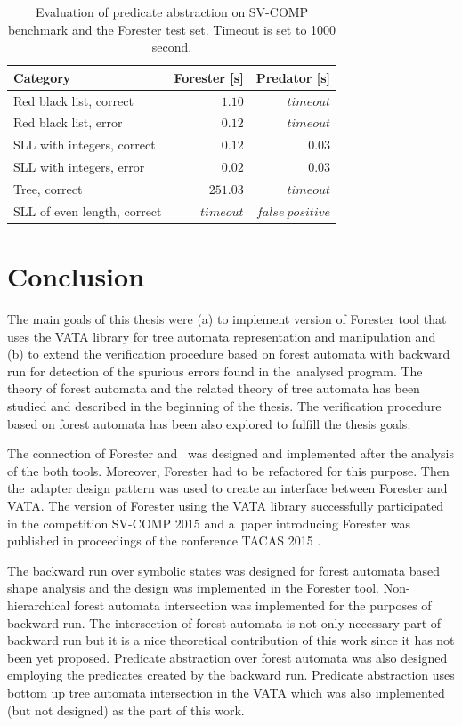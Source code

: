 \begin{table}[bt]
	\vskip6pt
	\caption{Evaluation of predicate abstraction on SV-COMP benchmark
		and the Forester test set.
		Timeout is set to 1000 second.
	}
	\centering
	\begin{tabular}{| l | r | r |}
		\hline
		Category & Forester [s] & Predator [s]  \\
		\hline
		\hline
		Red black list, correct     & $1.10$   &  $timeout$ \\
		\hline
		Red black list, error       & $0.12$   &  $timeout$ \\
		\hline
		SLL with integers, correct  & $0.12$   &  $0.03$ \\
		\hline
		SLL with integers, error    & $0.02$   &  $0.03$ \\
		\hline
		Tree, correct               & $251.03$ &  $timeout$ \\
		\hline
		SLL of even length, correct & $timeout$ & $false\ positive$ \\
		\hline
	\end{tabular}
	\label{tab:patimes}
\end{table}


\chapter{Conclusion}
\label{ch:concl}

The main goals of this thesis were (a) to implement version of Forester tool
that uses the VATA library for tree automata representation and manipulation
and (b) to extend the verification procedure based on forest automata with
backward run for detection of the spurious errors found in the~analysed program.
The theory of forest automata and the related theory of tree automata has been studied
and described in the beginning of the thesis.
The verification procedure based on forest automata
has been also explored to fulfill the thesis goals.

The connection of Forester and \vata\ was designed and implemented
after the analysis of the both tools.
Moreover, Forester had to be refactored for this purpose.
Then the~adapter design pattern was used to create an interface between Forester and VATA.
The version of Forester using the VATA library successfully participated
in the competition SV-COMP 2015 \cite{www:svcomp} and a~paper introducing
Forester was published in proceedings of the conference TACAS 2015 \cite{svcomp15}.

The backward run over symbolic states was designed for forest automata based shape analysis
and the design was implemented in the Forester tool.
Non-hierarchical forest automata intersection was implemented for
the purposes of backward run.
The intersection of forest automata is not only necessary part of backward run
but it is a nice theoretical contribution of this work since it has not
been yet proposed.
Predicate abstraction over forest automata was also designed employing the predicates
created by the backward run.
Predicate abstraction uses bottom up tree automata intersection in the VATA
which was also implemented (but not designed) as the part of this work.

